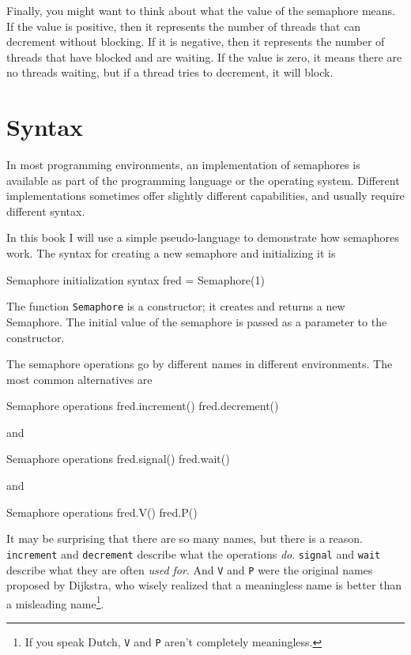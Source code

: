 Finally, you might want to think about what the value of the
semaphore means.  If the value is positive, then it represents the
number of threads that can decrement without blocking.  If it
is negative, then it represents the number of threads that have
blocked and are waiting.  If the value is zero, it means there
are no threads waiting, but if a thread tries to decrement, it
will block.


\section{Syntax}

In most programming environments, an implementation of semaphores is
available as part of the programming language or the operating system.
Different implementations sometimes offer slightly different
capabilities, and usually require different syntax.

In this book I will use a simple pseudo-language to demonstrate
how semaphores work.  The syntax for creating a new semaphore
and initializing it is

\begin{lstbox}{Semaphore initialization syntax}
fred = Semaphore(1)
\end{lstbox}

The function {\tt Semaphore} is a constructor; it creates and
returns a new Semaphore.  The initial value of the semaphore
is passed as a parameter to the constructor.

The semaphore operations go by different names in different environments.
The most common alternatives are 

\begin{lstbox}{Semaphore operations}
fred.increment()
fred.decrement()	
\end{lstbox}

and

\begin{lstbox}{Semaphore operations}
fred.signal()
fred.wait()	
\end{lstbox}

and

\begin{lstbox}{Semaphore operations}
fred.V()
fred.P()	
\end{lstbox}

It may be surprising that there are so many names, but there is a
reason.  {\tt increment} and {\tt decrement}
describe what the operations {\em do}.  {\tt signal} and {\tt wait}
describe what they are often {\em used for}.  And {\tt V} and {\tt P} were
the original names proposed by Dijkstra, who wisely realized that a
meaningless name is better than a misleading name\footnote{If you speak
Dutch, {\tt V} and {\tt P} aren't completely meaningless.}.

